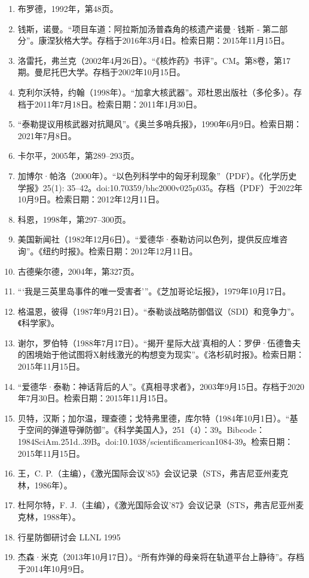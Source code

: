 \begin{enumerate}
\item 布罗德，1992年，第48页。
\item 钱斯，诺曼。“项目车道：阿拉斯加汤普森角的核遗产诺曼·钱斯 - 第二部分”。康涅狄格大学。存档于2016年3月4日。检索日期：2015年11月15日。
\item 洛雷托，弗兰克（2002年4月26日）。“《核炸药》书评”。CM。第8卷，第17期。曼尼托巴大学。存档于2002年10月15日。
\item 克利尔沃特，约翰（1998年）。“加拿大核武器”。邓杜恩出版社（多伦多）。存档于2011年7月18日。检索日期：2011年1月30日。
\item “泰勒提议用核武器对抗飓风”。《奥兰多哨兵报》，1990年6月9日。检索日期：2021年7月8日。
\item 卡尔平，2005年，第289–293页。
\item 加博尔·帕洛（2000年）。“以色列科学中的匈牙利现象”（PDF）。《化学历史学报》25(1): 35–42。doi:10.70359/bhc2000v025p035。存档（PDF）于2022年10月9日。检索日期：2012年12月11日。
\item 科恩，1998年，第297–300页。
\item 美国新闻社（1982年12月6日）。“爱德华·泰勒访问以色列，提供反应堆咨询”。《纽约时报》。检索日期：2012年12月11日。
\item 古德柴尔德，2004年，第327页。
\item “‘我是三英里岛事件的唯一受害者’”。《芝加哥论坛报》，1979年10月17日。
\item 格温恩，彼得（1987年9月21日）。“泰勒谈战略防御倡议（SDI）和竞争力”。《科学家》。
\item 谢尔，罗伯特（1988年7月17日）。“揭开‘星际大战’真相的人：罗伊·伍德鲁夫的困境始于他试图将X射线激光的构想变为现实”。《洛杉矶时报》。检索日期：2015年11月15日。
\item “爱德华·泰勒：神话背后的人”。《真相寻求者》，2003年9月15日。存档于2020年7月30日。检索日期：2015年11月15日。
\item 贝特，汉斯；加尔温，理查德；戈特弗里德，库尔特（1984年10月1日）。“基于空间的弹道导弹防御”。《科学美国人》，251（4）：39。Bibcode：1984SciAm.251d..39B。doi:10.1038/scientificamerican1084-39。检索日期：2015年11月15日。
\item 王，C. P.（主编），《激光国际会议'85》会议记录（STS，弗吉尼亚州麦克林，1986年）。
\item 杜阿尔特，F. J.（主编），《激光国际会议'87》会议记录（STS，弗吉尼亚州麦克林，1988年）。
\item 行星防御研讨会 LLNL 1995
\item 杰森·米克（2013年10月17日）。“所有炸弹的母亲将在轨道平台上静待”。存档于2014年10月9日。

\end{enumerate}
